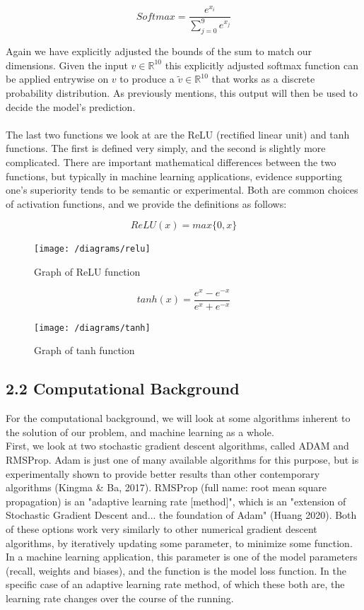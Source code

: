 \documentclass{article}
\begin{document}
\[Softmax = \frac{e^{x_i}}{\sum_{j=0}^9 e^{x_j}}\]

Again we have explicitly adjusted the bounds of the sum to match our dimensions. Given the input $v\in \mathbb{R}^{10}$ this explicitly adjusted softmax function can be applied entrywise on $v$ to produce a $\tilde v \in \mathbb{R}^{10}$ that works as a discrete probability distribution. As previously mentions, this output will then be used to decide the model's prediction.\\\\

The last two functions we look at are the ReLU (rectified linear unit) and tanh functions. The first is defined very simply, and the second is slightly more complicated. There are important mathematical differences between the two functions, but typically in machine learning applications, evidence supporting one's superiority tends to be semantic or experimental. Both are common choices of activation functions, and we provide the definitions as follows:
\pagebreak
\begin{centering}
\[ReLU(x) = max\{0, x\}\]
\begin{figure}[H]
\texttt{[image: /diagrams/relu]}
\caption{Graph of ReLU function}
\end{figure}
\[tanh(x) = \frac{e^{x} - e^{-x}}{e^{x}+e^{-x}}\]
\begin{figure}[H]
\texttt{[image: /diagrams/tanh]}
\caption{Graph of tanh function}
\end{figure}
\end{centering}

\subsection*{2.2 Computational Background}

For the computational background, we will look at some algorithms inherent to the solution of our problem, and machine learning as a whole.\\

First, we look at two stochastic gradient descent algorithms, called ADAM and RMSProp. Adam is just one of many available algorithms for this purpose, but is experimentally shown to provide better results than other contemporary algorithms (Kingma \& Ba, 2017). RMSProp (full name: root mean square propagation) is an "adaptive learning rate [method]", which is an "extension of Stochastic Gradient Descent and... the foundation of Adam" (Huang 2020). Both of these options work very similarly to other numerical gradient descent algorithms, by iteratively updating some parameter, to minimize some function. In a machine learning application, this parameter is one of the model parameters (recall, weights and biases), and the function is the model loss function. In the specific case of an adaptive learning rate method, of which these both are, the learning rate changes over the course of the running.\\\\
\end{document}
